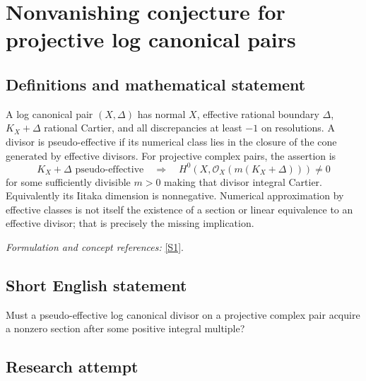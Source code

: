 \documentclass[11pt,a4paper]{article}
\newcommand{\sref}[2]{\hyperlink{source:#1:#2}{[S#2]}}
\newif\ifshowcatalogue
\newcommand{\cataloguescope}[1]{\ifshowcatalogue
 \paragraph{Exact scope in the supplied catalogue.}
 \begin{quote}\small #1\end{quote}\fi}
\numberwithin{equation}{section}
\begin{document}
\setcounter{section}{0}
\clearpage
\section*{\texorpdfstring{Nonvanishing conjecture for projective log canonical pairs}{Nonvanishing conjecture for projective log canonical pairs}}\label{30006784}
\subsection{Definitions and mathematical statement}
A log canonical pair $(X,\Delta)$ has normal $X$, effective rational boundary $\Delta$, $K_X+\Delta$ rational Cartier, and all discrepancies at least $-1$ on resolutions. A divisor is pseudo-effective if its numerical class lies in the closure of the cone generated by effective divisors. For projective complex pairs, the assertion is
\[
 K_X+\Delta\text{ pseudo-effective}
 \quad\Longrightarrow\quad
 H^0(X,\mathcal O_X(m(K_X+\Delta)))\ne0
\]
for some sufficiently divisible $m>0$ making that divisor integral Cartier. Equivalently its Iitaka dimension is nonnegative. Numerical approximation by effective classes is not itself the existence of a section or linear equivalence to an effective divisor; that is precisely the missing implication.
\par\smallskip\textit{Formulation and concept references:} \sref{30006784}{1}.
\cataloguescope{Let (X, Delta) be a projective log canonical pair over the complex numbers, with Delta a Q-divisor and K\_X+Delta Q-Cartier. If K\_X+Delta is pseudo-effective, prove that kappa(K\_X+Delta) >= 0; equivalently, some sufficiently divisible positive multiple of K\_X+Delta is linearly equivalent to an effective divisor.}
\subsection{Short English statement}
Must a pseudo-effective log canonical divisor on a projective complex pair acquire a nonzero section after some positive integral multiple?
\subsection{Research attempt}
\end{document}
